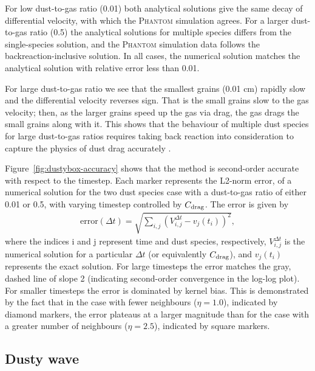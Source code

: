 \documentclass[fleqn,usenatbib]{mnras}
\begin{document}
For low dust-to-gas ratio (0.01) both analytical solutions give the same decay
of differential velocity, with which the \textsc{Phantom} simulation agrees. For
a larger dust-to-gas ratio (0.5) the analytical solutions for multiple species
differs from the single-species solution, and the \textsc{Phantom} simulation
data follows the backreaction-inclusive solution. In all cases, the numerical
solution matches the analytical solution with relative error less than 0.01.

For large dust-to-gas ratio we see that the smallest grains (0.01 cm) rapidly
slow and the differential velocity reverses sign. That is the small grains slow
to the gas velocity; then, as the larger grains speed up the gas via drag, the
gas drags the small grains along with it. This shows that the behaviour of
multiple dust species for large dust-to-gas ratios requires taking back reaction
into consideration to capture the physics of dust drag accurately
\citep{Gonzalez2017MNRAS.467.1984G,Dipierro2018MNRAS.479.4187D}.

Figure~\ref{fig:dustybox-accuracy} shows that the method is second-order
accurate with respect to the timestep. Each marker represents the L2-norm error,
of a numerical solution for the two dust species case with a dust-to-gas ratio
of either 0.01 or 0.5, with varying timestep controlled by \(C_{\rm drag}\). The
error is given by
%
\begin{align}
   \mathrm{error}(\Delta t) = \sqrt{ \sum_{i,j}
      \left(V_{i,j}^{\Delta t} - v_{j}(t_i) \right)^2 },
\end{align}
%
where the indices i and j represent time and dust species, respectively,
\(V_{i,j}^{\Delta t}\) is the numerical solution for a particular \(\Delta t\)
(or equivalently \(C_{\rm drag}\)), and \(v_{j}(t_i)\) represents the exact
solution. For large timesteps the error matches the gray, dashed line of slope 2
(indicating second-order convergence in the log-log plot). For smaller timesteps
the error is dominated by kernel bias. This is demonstrated by the fact that in
the case with fewer neighbours (\(\eta = 1.0\)), indicated by diamond markers,
the error plateaus at a larger magnitude than for the case with a greater number
of neighbours (\(\eta = 2.5\)), indicated by square markers.

\subsection{Dusty wave}%
\label{subsec:wave}
\end{document}
